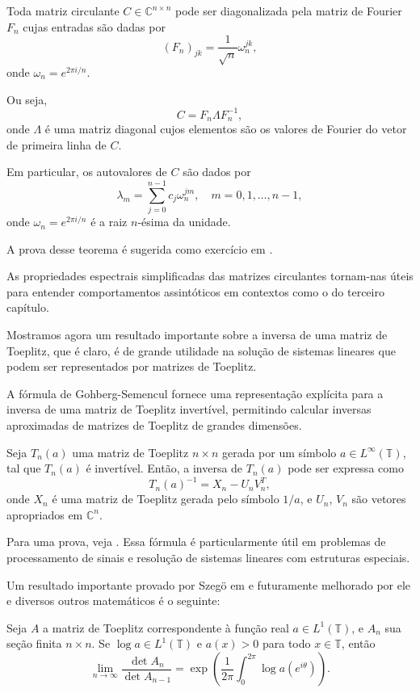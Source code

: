 \begin{theorem*}
  Toda matriz circulante $ C \in \mathbb{C}^{n \times n} $ pode ser diagonalizada pela matriz de Fourier $ F_n $ cujas entradas são dadas por
  \[
    (F_n)_{jk} = \frac{1}{\sqrt{n}} \omega_n^{jk},
  \]
  onde $ \omega_n = e^{2\pi i / n} $.

  Ou seja,
  \[
    C = F_n \Lambda F_n^{-1},
  \]
  onde $ \Lambda $ é uma matriz diagonal cujos elementos são os valores de Fourier do vetor de primeira linha de $ C $.

  Em particular, os autovalores de $ C $ são dados por
  \[
    \lambda_m = \sum_{j=0}^{n-1} c_j \omega_n^{jm}, \quad m = 0, 1, \dots, n-1,
  \]
  onde $ \omega_n = e^{2\pi i / n} $ é a raiz $ n $-ésima da unidade.
\end{theorem*}

A prova desse teorema é sugerida como exercício em \cite[p. 100]{horn2013matrix}.

As propriedades espectrais simplificadas das matrizes circulantes tornam-nas úteis para entender comportamentos assintóticos em contextos como o do terceiro capítulo.

Mostramos agora um resultado importante sobre a inversa de uma matriz de Toeplitz, que é claro, é de grande utilidade na solução de sistemas lineares que podem ser representados por matrizes de Toeplitz.

A fórmula de Gohberg-Semencul fornece uma representação explícita para a inversa de uma matriz de Toeplitz invertível, permitindo calcular inversas aproximadas de matrizes de Toeplitz de grandes dimensões.
\begin{theorem*}
  Seja $ T_n(a)$ uma matriz de Toeplitz $ n \times n$ gerada por um símbolo $ a \in L^\infty(\mathbb{T})$, tal que $ T_n(a)$ é invertível. Então, a inversa de $ T_n(a)$ pode ser expressa como
  \[
    T_n(a)^{-1} = X_n - U_n V_n^T,
  \]
  onde $ X_n$ é uma matriz de Toeplitz gerada pelo símbolo $1 / a$, e $ U_n$, $ V_n$ são vetores apropriados em $ \mathbb{C}^n$.
\end{theorem*}
Para uma prova, veja \cite{gohberg1972}.
Essa fórmula é particularmente útil em problemas de processamento de sinais e resolução de sistemas lineares com estruturas especiais.

Um resultado importante provado por Szegö em \cite{szego1915} e futuramente melhorado por ele e diversos outros matemáticos é o seguinte:
\begin{theorem*}
  Seja $A$ a matriz de Toeplitz correspondente à função real $a \in L^1(\mathbb{T})$, e $A_n$ sua seção finita $n \times n$. Se $\log a \in L^1(\mathbb{T})$ e $a(x) > 0$ para todo $x \in \mathbb{T}$, então \[\lim_{n\to \infty} \frac{\det A_n}{\det A_{n-1}} = \exp\left(\frac{1}{2\pi} \int_{0}^{2\pi} \log a\left(e^{i\theta}\right) \right)\text{.}\]
\end{theorem*}

